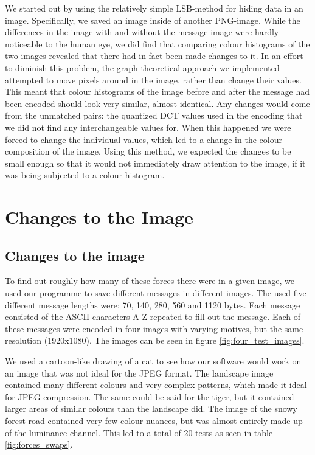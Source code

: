 We started out by using the relatively simple LSB-method for hiding data in an image.
Specifically, we saved an image inside of another PNG-image.
While the differences in the image with and without the message-image were hardly noticeable to the human eye, we did find that comparing colour histograms of the two images revealed that there had in fact been made changes to it.
In an effort to diminish this problem, the graph-theoretical approach we implemented attempted to move pixels around in the image, rather than change their values.
This meant that colour histograms of the image before and after the message had been encoded should look very similar, almost identical.
Any changes would come from the unmatched pairs: the quantized DCT values used in the encoding that we did not find any interchangeable values for.
When this happened we were forced to change the individual values, which led to a change in the colour composition of the image.
Using this method, we expected the changes to be small enough so that it would not immediately draw attention to the image, if it was being subjected to a colour histogram.

\section{Changes to the Image}
\label{sec:changestoimage}
\subsection{Changes to the image}
To find out roughly how many of these forces there were in a given image, we used our programme to save different messages in different images.
The used five different message lengths were: 70, 140, 280, 560 and 1120 bytes.
Each message consisted of the ASCII characters A-Z repeated to fill out the message.
Each of these messages were encoded in four images with varying motives, but the same resolution (1920x1080).
The images can be seen in figure \ref{fig:four_test_images}.

We used a cartoon-like drawing of a cat to see how our software would work on an image that was not ideal for the JPEG format.
The landscape image contained many different colours and very complex patterns, which made it ideal for JPEG compression.
The same could be said for the tiger, but it contained larger areas of similar colours than the landscape did.
The image of the snowy forest road contained very few colour nuances, but was almost entirely made up of the luminance channel.
This led to a total of 20 tests as seen in table \ref{fig:forces_swaps}.


